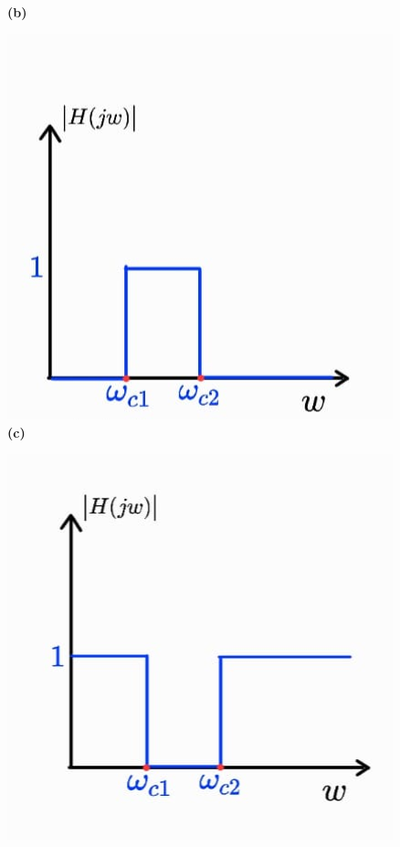 \begin{figure}[h!]
\begin{minipage}[b]{0.32\linewidth}
        \centering
        \\ \textbf{(b)}
    \end{minipage}
    \begin{minipage}[b]{0.32\linewidth}     
        \includegraphics[width=\linewidth]{figuras/passa_faixa.png}
        \centering
        \\ \textbf{(c)}
    \end{minipage}
    \begin{minipage}[b]{0.32\linewidth}
        \includegraphics[width=\linewidth]{figuras/rejeita_faixa.png}

\end{minipage}
\end{figure}
